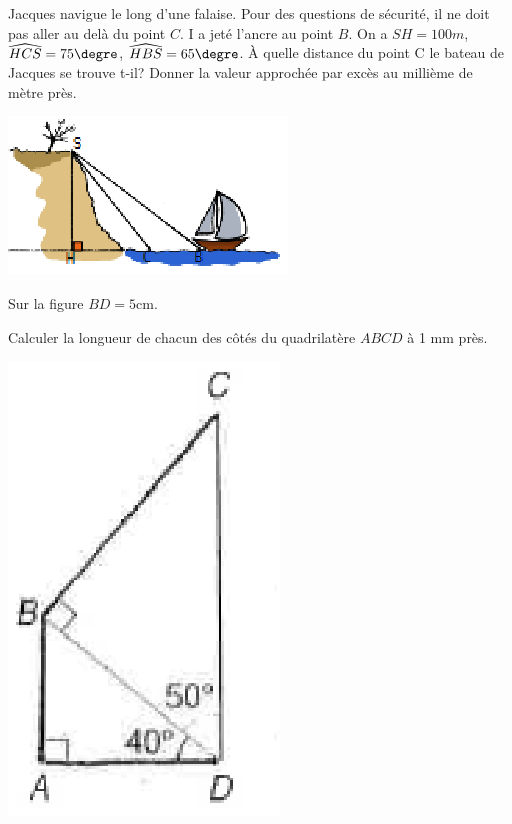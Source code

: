 \begin{exercice}
Jacques navigue le long d'une falaise. Pour des questions de sécurité, il ne doit pas aller au delà du point $C$. I a jeté l'ancre au point $B$. On a $SH=100m$, $\widehat{HCS}=75\textrm{\degre}$, $\widehat{HBS}=65\textrm{\degre}$. À quelle distance du point C le bateau de Jacques se trouve t-il? Donner la valeur approchée par excès au millième de mètre près.
\begin{center}
\includegraphics[scale=1]{Trigonometrie/figures/bateau_trigo.eps}
\end{center}
\end{exercice}

\begin{exercice}
Sur la figure $BD=5$cm.

Calculer la longueur de chacun des côtés du quadrilatère $ABCD$ à 1 mm près.

\begin{center}
\includegraphics[scale=0.6]{Trigonometrie/figures/quadrilatere.eps}
\end{center}
\end{exercice}

